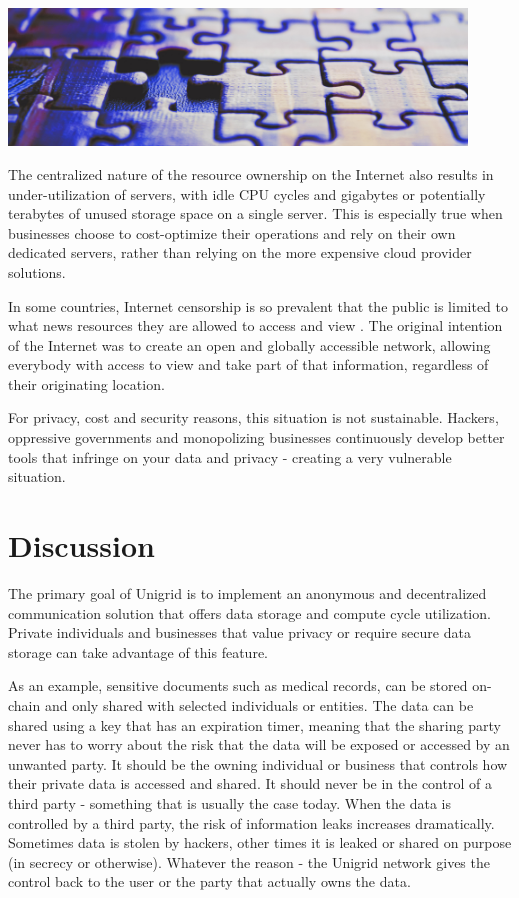 \documentclass{article}
\begin{document}
\begin{mdframed}[style=textimage]
	\includegraphics[width=345pt]{puzzle}
\end{mdframed}

\noindent The centralized nature of the resource ownership on the Internet also results in under-utilization of servers, with idle CPU cycles and gigabytes or potentially terabytes of unused storage space on a single server. This is especially true when businesses choose to cost-optimize their operations and rely on their own dedicated servers, rather than relying on the more expensive cloud provider solutions.

In some countries, Internet censorship is so prevalent that the public is limited to what news resources they are allowed to access and view \cite{wiki2021}. The original intention of the Internet was to create an open and globally accessible network, allowing everybody with access to view and take part of that information, regardless of their originating location.

For privacy, cost and security reasons, this situation is not sustainable. Hackers, oppressive governments and monopolizing businesses continuously develop better tools that infringe on your data and privacy - creating a very vulnerable situation.

\section{Discussion}
The primary goal of Unigrid is to implement an anonymous and decentralized communication solution that offers data storage and compute cycle utilization. Private individuals and businesses that value privacy or require secure data storage can take advantage of this feature.

As an example, sensitive documents such as medical records, can be stored on-chain and only shared with selected individuals or entities. The data can be shared using a key that has an expiration timer, meaning that the sharing party never has to worry about the risk that the data will be exposed or accessed by an unwanted party. It should be the owning individual or business that controls how their private data is accessed and shared. It should never be in the control of a third party - something that is usually the case today. When the data is controlled by a third party, the risk of information leaks increases dramatically. Sometimes data is stolen by hackers, other times it is leaked or shared on purpose (in secrecy or otherwise). Whatever the reason - the Unigrid network gives the control back to the user or the party that actually owns the data.
\end{document}
